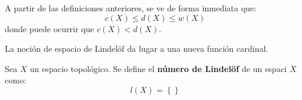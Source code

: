 \documentclass[12pt]{report}
\theoremstyle{largebreak}
\begin{document}
    A partir de las definiciones anteriores, se ve de forma inmediata que:
    \begin{equation*}
        c(X)\leq d(X)\leq w(X)
    \end{equation*}
    donde puede ocurrir que $c(X)<d(X)$.

    La noción de espacio de Lindelöf da lugar a una nueva función cardinal.

    \begin{mydef}
        Sea $X$ un espacio topológico. Se define el \textbf{número de Lindelöf} de un espaci $X$ como:
        \begin{equation*}
            l(X)=\left\{ \right\}
        \end{equation*}
    \end{mydef}
\end{document}
